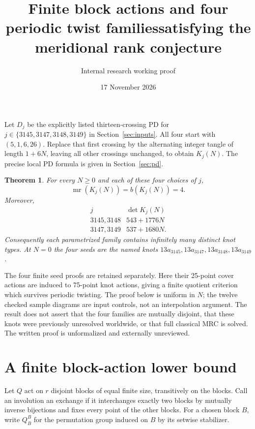 \documentclass[11pt]{article}
\title{Finite block actions and four periodic twist families\newline satisfying the meridional rank conjecture}
\author{Internal research working proof}
\date{17 November 2026}
\newtheorem{theorem}{Theorem}
\newcommand{\mr}{\operatorname{mr}}
\begin{document}
\maketitle

Let $D_j$ be the explicitly listed thirteen-crossing PD for
$j\in\{3145,3147,3148,3149\}$ in Section~\ref{sec:inputs}.
All four start with $(5,1,6,26)$. Replace that first crossing
by the alternating integer tangle of length $1+6N$, leaving
all other crossings unchanged, to obtain $K_j(N)$.
The precise local PD formula is given in Section~\ref{sec:pd}.

\begin{theorem}\label{thm:families}
For every $N\ge0$ and each of these four choices of $j$,
\[
                     \mr(K_j(N))=b(K_j(N))=4.
\]
Moreover,
\[
\begin{array}{c|c}
j&\det K_j(N)\\\hline
3145,3148&543+1776N\\
3147,3149&537+1680N.
\end{array}
\]
Consequently each parametrized family contains infinitely
many distinct knot types. At $N=0$ the four seeds are the
named knots $13a_{3145},13a_{3147},13a_{3148},13a_{3149}$.
\end{theorem}

The four finite seed proofs are retained separately. Here
their 25-point cover actions are induced to 75-point knot
actions, giving a finite quotient criterion which survives
periodic twisting. The proof below is uniform in $N$;
the twelve checked sample diagrams are input controls,
not an interpolation argument. The result does not assert
that the four families are mutually disjoint, that these
knots were previously unresolved worldwide, or that full
classical MRC is solved. The written proof is unformalized
and externally unreviewed.

\section{A finite block-action lower bound}

Let $Q$ act on $r$ disjoint blocks of equal finite size,
transitively on the blocks. Call an involution an exchange
if it interchanges exactly two blocks by mutually inverse
bijections and fixes every point of the other blocks.
For a chosen block $B$, write $Q_B^B$ for the permutation
group induced on $B$ by its setwise stabilizer.
\end{document}
